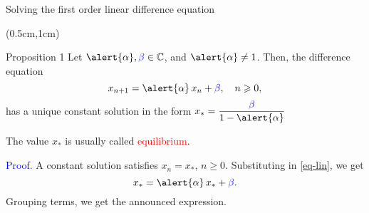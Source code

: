 \documentclass[xcolor=dvipsnames]{beamer} %
\begin{document}
	
	\begin{frame}{Solving the first order linear difference equation}
	
	\transwipe
	
	\begin{textblock*}{12cm}(0.5cm,1cm)
	
	\begin{block}{Proposition 1} Let $\alert{\alpha}, \textcolor{blue}{\beta} \in \mathbb{C}$, and $\alert{\alpha} \neq 1$. Then, the difference equation
	\begin{equation}\label{eq-lin}
	x_{n+1} = \alert{\alpha} \,x_n + \textcolor{blue}{\beta}, \quad n\geqslant 0,
	\end{equation}
	has a unique constant solution in the form $\displaystyle{x_{*} = \frac{\textcolor{blue}{\beta}}{1-\alert{\alpha}}}$
	\end{block}
	
	\end{textblock*}
	
	\vspace{4cm}
	
	The value $x_*$ is usually called \textcolor{red}{equilibrium}.
	
	\vspace{1cm}
	
	\textcolor{blue}{Proof.} A constant solution satisfies $x_n = x_*$, $n\geqslant0$. Substituting in \eqref{eq-lin}, we get
	$$
	x_{*} = \alert{\alpha} \,x_* + \textcolor{blue}{\beta}.
	$$
	Grouping terms, we get the announced expression.
	\end{frame}
	
	
\end{document}
